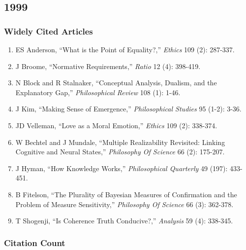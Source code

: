 \documentclass[
  10pt,
  letterpaper,
  DIV=11,
  numbers=noendperiod,
  twoside]{scrartcl}
\providecommand{\tightlist}{%
  \setlength{\itemsep}{0pt}\setlength{\parskip}{0pt}}\usepackage{longtable,booktabs,array}
\begin{document}
\newpage

\subsection{1999}\label{sec-s1999}

\subsubsection*{Widely Cited Articles}\label{widely-cited-articles-23}

\begin{enumerate}
\def\labelenumi{\arabic{enumi}.}
\tightlist
\item
  ES Anderson, ``What is the Point of Equality?,'' \emph{Ethics} 109
  (2): 287-337.
\item
  J Broome, ``Normative Requirements,'' \emph{Ratio} 12 (4): 398-419.
\item
  N Block and R Stalnaker, ``Conceptual Analysis, Dualism, and the
  Explanatory Gap,'' \emph{Philosophical Review} 108 (1): 1-46.
\item
  J Kim, ``Making Sense of Emergence,'' \emph{Philosophical Studies} 95
  (1-2): 3-36.
\item
  JD Velleman, ``Love as a Moral Emotion,'' \emph{Ethics} 109 (2):
  338-374.
\item
  W Bechtel and J Mundale, ``Multiple Realizability Revisited: Linking
  Cognitive and Neural States,'' \emph{Philosophy Of Science} 66 (2):
  175-207.
\item
  J Hyman, ``How Knowledge Works,'' \emph{Philosophical Quarterly} 49
  (197): 433-451.
\item
  B Fitelson, ``The Plurality of Bayesian Measures of Confirmation and
  the Problem of Measure Sensitivity,'' \emph{Philosophy Of Science} 66
  (3): 362-378.
\item
  T Shogenji, ``Is Coherence Truth Conducive?,'' \emph{Analysis} 59 (4):
  338-345.
\end{enumerate}

\subsubsection*{Citation Count}\label{sec-count-1999}
\end{document}
